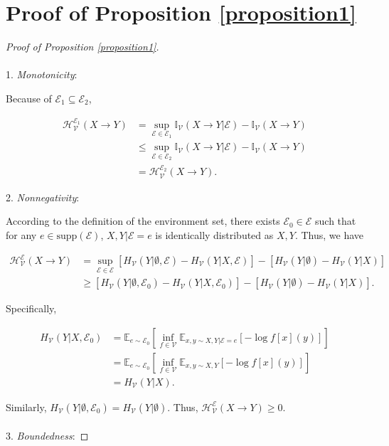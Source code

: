\section{Proof of Proposition \ref{proposition1}}
\label{proof: prop1}
\begin{proof}[Proof of Proposition \ref{proposition1}]
\\\\
1. \emph{Monotonicity}:

Because of $\mathscr E_1 \subseteq \mathscr E_2$,
\begin{small}
\begin{align}
   \mathcal{H}^{\mathscr E_1}_{\mathcal V}(X \rightarrow Y) &= \sup_{\mathcal{E} \in \mathscr E_1}\mathbb{I}_{\mathcal{V}}(X\rightarrow Y|\mathcal{E})-\mathbb{I}_{\mathcal{V}}(X\rightarrow Y) \\
    &\leq \sup_{\mathcal{E} \in \mathscr E_2}\mathbb{I}_{\mathcal{V}}(X\rightarrow Y|\mathcal{E})-\mathbb{I}_{\mathcal{V}}(X\rightarrow Y) \\
    &= \mathcal{H}^{\mathscr E_2}_{\mathcal V}(X \rightarrow Y).
\end{align}
\end{small}
2. \emph{Nonnegativity}:

According to the definition of the environment set, there exists $\mathcal E_0 \in \mathscr E$ such that for any $e \in \text{supp}(\mathcal E)$, $X,Y|\mathcal E=e$ is identically distributed as $X,Y$. Thus, we have
\begin{small}
\begin{align}
    \mathcal{H}^{\mathscr E}_{\mathcal V}(X \rightarrow Y) &=
    \sup_{\mathcal{E} \in \mathscr E} \left[H_\mathcal V(Y|\emptyset,\mathcal E) - H_\mathcal V(Y|X,\mathcal E)\right] - \left[H_\mathcal V(Y|\emptyset) - H_\mathcal V(Y|X)\right] \\
    &\geq \left[H_\mathcal V(Y|\emptyset,\mathcal E_0) - H_\mathcal V(Y|X,\mathcal E_0)\right] - \left[H_\mathcal V(Y|\emptyset) - H_\mathcal V(Y|X)\right].
\end{align}
\end{small}
Specifically, 
\begin{small}
\begin{align}
    H_\mathcal V(Y|X,\mathcal E_0) &= \mathbb E_{e \sim \mathcal E_0} \left[ \inf\limits_{f\in\mathcal{V}}\mathbb{E}_{x,y\sim X,Y | \mathcal E=e}[-\log f[x](y)] \right] \\
    &= \mathbb E_{e \sim \mathcal E_0} \left[ \inf\limits_{f\in\mathcal{V}}\mathbb{E}_{x,y\sim X,Y}[-\log f[x](y)] \right] \\
    &= H_\mathcal V(Y|X).
\end{align}
\end{small}
Similarly, $H_\mathcal V(Y|\emptyset,\mathcal E_0) = H_\mathcal V(Y|\emptyset)$.
Thus, $\mathcal{H}^{\mathscr E}_{\mathcal V}(X \rightarrow Y) \geq 0$.\\\\
3. \emph{Boundedness}:


\end{proof}

